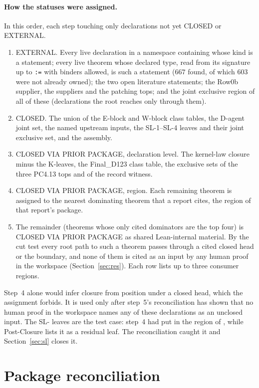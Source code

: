 \documentclass[10pt]{article}
\newcommand{\SL}[1]{\textsf{SL-#1}}
\begin{document}
\paragraph{How the statuses were assigned.} In this order, each step touching only declarations not yet CLOSED or EXTERNAL.
\begin{enumerate}[nosep]
\item EXTERNAL. Every live declaration in a namespace containing  whose kind is a statement; every live theorem whose declared type, read from its signature up to \texttt{:=} with binders allowed, is such a statement ($667$ found, of which $603$ were not already owned); the two open literature statements; the Row0b supplier, the  suppliers and the patching tops; and the joint exclusive region of all of these (declarations the root reaches only through them).
\item CLOSED. The union of the E-block and W-block class tables, the D-agent joint set, the named upstream inputs, the \SL{1}--\SL{4} leaves and their joint exclusive set, and the assembly.
\item CLOSED VIA PRIOR PACKAGE, declaration level. The kernel-law closure minus the K-leaves, the Final\_D123 class table, the exclusive sets of the three PC4.13 tops and of the record witness.
\item CLOSED VIA PRIOR PACKAGE, region. Each remaining theorem is assigned to the nearest dominating theorem that a report cites, the region of that report's package.
\item The remainder (theorems whose only cited dominators are the top four) is CLOSED VIA PRIOR PACKAGE as shared Lean-internal material. By the cut test every root path to such a theorem passes through a cited closed head or the boundary, and none of them is cited as an input by any human proof in the workspace (Section~\ref{sec:res}). Each row lists up to three consumer regions.
\end{enumerate}

Step~4 alone would infer closure from position under a closed head, which the assignment forbids. It is used only after step~5's reconciliation has shown that no human proof in the workspace names any of these declarations as an unclosed input. The \SL{} leaves are the test case: step~4 had put  in the region of , while Post-Closure lists it as a residual leaf. The reconciliation caught it and Section~\ref{sec:sl} closes it.

\section{Package reconciliation}\label{sec:pkg}
\end{document}
